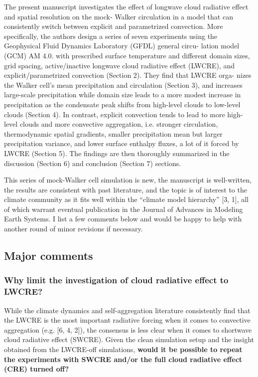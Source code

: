 \documentclass[draft]{agujournal2019}
\begin{document}
The present manuscript investigates the effect of longwave cloud radiative effect and spatial resolution on the mock-
Walker circulation in a model that can consistently switch between explicit and parametrized convection. More specifically,
the authors design a series of seven experiments using the Geophysical Fluid Dynamics Laboratory (GFDL) general circu-
lation model (GCM) AM 4.0. with prescribed surface temperature and different domain sizes, grid spacing, active/inactive
longwave cloud radiative effect (LWCRE), and explicit/parametrized convection (Section 2). They find that LWCRE orga-
nizes the Walker cell’s mean precipitation and circulation (Section 3), and increases large-scale precipitation while domain
size leads to a more modest increase in precipitation as the condensate peak shifts from high-level clouds to low-level clouds
(Section 4). In contrast, explicit convection tends to lead to more high-level clouds and more convective aggregation, i.e.
stronger circulation, thermodynamic spatial gradients, smaller precipitation mean but larger precipitation variance, and
lower surface enthalpy fluxes, a lot of it forced by LWCRE (Section 5). The findings are then thoroughly summarized in
the discussion (Section 6) and conclusion (Section 7) sections.

This series of mock-Walker cell simulation is new, the manuscript is well-written, the results are consistent with past
literature, and the topic is of interest to the climate community as it fits well within the “climate model hierarchy” [3, 1],
all of which warrant eventual publication in the Journal of Advances in Modeling Earth Systems. I list a few comments
below and would be happy to help with another round of minor revisions if necessary.

\subsection{Major comments}
\subsubsection{Why limit the investigation of cloud radiative effect to LWCRE?}
While the climate dynamics and self-aggregation literature consistently find that the LWCRE is the most important
radiative forcing when it comes to convective aggregation (e.g. [6, 4, 2]), the consensus is less clear when it comes to
shortwave cloud radiative effect (SWCRE). Given the clean simulation setup and the insight obtained from the LWCRE-off
simulations, \textbf{would it be possible to repeat the experiments with SWCRE and/or the full cloud radiative
effect (CRE) turned off?}
\end{document}

